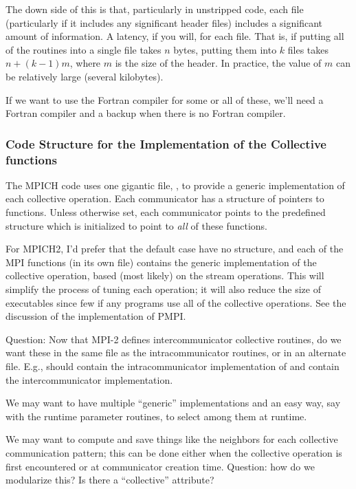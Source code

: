 \documentclass{article}
\begin{document}
The down side of this is that, particularly in unstripped code, each
file (particularly if it includes any significant header files)
includes a significant amount of information.  A latency, if you will,
for each file.  That is, if putting all of the routines into a single
file takes $n$ bytes, putting them into $k$ files takes $n + (k-1)m$,
where $m$ is the size of the header.  In practice, the value of $m$ can be
relatively large (several kilobytes).

If we want to use the Fortran compiler for some or all of these, we'll
need a Fortran compiler and a backup when there is no Fortran compiler.

\subsubsection{Code Structure for the Implementation of the Collective
  functions} 

The MPICH code uses one gigantic file, , to provide a
generic implementation of each collective operation.  Each
communicator has a structure of pointers to functions.  Unless
otherwise set, each communicator points to the predefined structure
 which is
initialized to point to \emph{all} of 
these functions.  

For MPICH2, I'd prefer that the default case have no structure, and
each of the MPI functions (in its own file) contains the generic
implementation of the collective operation, based (most likely) on the
stream operations.  This will simplify the process of tuning each
operation; it will also reduce the size of executables since few if
any programs use all of the collective operations.
See the discussion of the implementation of PMPI.

Question: Now that MPI-2 defines intercommunicator collective
routines, do we want these in the same file as the intracommunicator
routines, or in an alternate file.  E.g., should  contain
the intracommunicator implementation of  and
 contain the intercommunicator implementation.

We may want to have multiple ``generic'' implementations and an easy
way, say with the runtime parameter routines, to select among them at runtime.

We may want to compute and save things like the neighbors for each
collective communication pattern; this can be done either when the
collective operation is first encountered or at communicator creation
time.  Question: how do we modularize this?  Is there a ``collective''
attribute?
\end{document}
